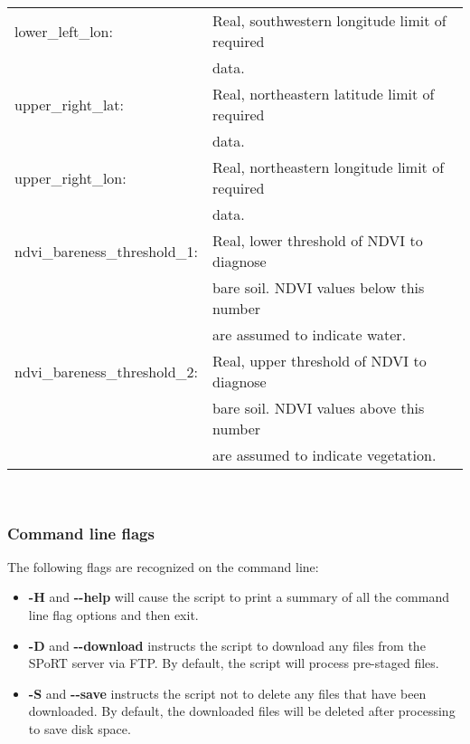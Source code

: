 \documentclass{article}
\begin{document}
\begin{tabular}{|l|l|}
lower\_left\_lon: & Real, southwestern longitude limit of required \\
                  & data. \\ \hline
upper\_right\_lat: & Real, northeastern latitude limit of required \\
                   & data. \\ \hline
upper\_right\_lon: & Real, northeastern longitude limit of required \\
                   & data. \\ \hline
ndvi\_bareness\_threshold\_1: & Real, lower threshold of NDVI to diagnose \\
                              & bare soil.  NDVI values below this number \\
                              & are assumed to indicate water. \\ \hline
ndvi\_bareness\_threshold\_2: & Real, upper threshold of NDVI to diagnose \\
                              & bare soil.  NDVI values above this number \\
                              & are assumed to indicate vegetation. \\ \hline
\end{tabular} \\

\subsubsection{Command line flags}
\label{subsubsec:GimmsCmdLineFlags}

The following flags are recognized on the command line:

\begin{itemize}

\item \textbf{-H} and \textbf{-{}-help} will cause the script to print 
a summary of all the command line flag options and then exit.

\item \textbf{-D} and \textbf{-{}-download} instructs the script to
download any files from the SPoRT server via FTP.  By default, the script will
process pre-staged files.

\item \textbf{-S} and \textbf{-{}-save} instructs the script not to delete
any files that have been downloaded.  By default, the downloaded files
will be deleted after processing to save disk space.

\end{itemize}
\end{document}
